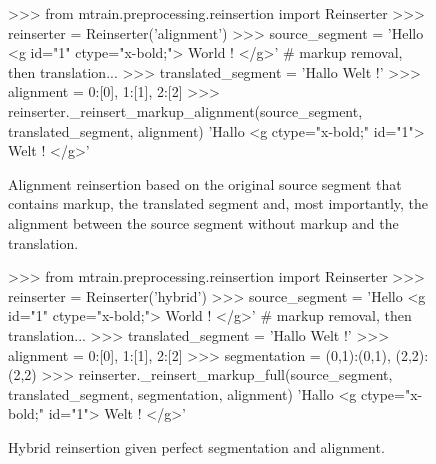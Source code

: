 \documentclass[11pt,letterpaper]{article}
\begin{document}
\begin{figure*}
\renewcommand\figurename{Listing}

\begin{python}
>>> from mtrain.preprocessing.reinsertion import Reinserter
>>> reinserter = Reinserter('alignment')
>>> source_segment = 'Hello <g id="1" ctype="x-bold;"> World ! </g>'
# markup removal, then translation...
>>> translated_segment = 'Hallo Welt !'
>>> alignment = {0:[0], 1:[1], 2:[2]}
>>> reinserter._reinsert_markup_alignment(source_segment, translated_segment,
    alignment)
'Hallo <g ctype="x-bold;" id="1"> Welt ! </g>'
\end{python}
\caption{Alignment reinsertion based on the original source segment that contains markup, the translated segment and, most importantly, the alignment between the source segment without markup and the translation.}
\label{py:alignmentreinsertion}
\end{figure*}

\begin{figure*}[]
\renewcommand\figurename{Listing}

\begin{python}
>>> from mtrain.preprocessing.reinsertion import Reinserter
>>> reinserter = Reinserter('hybrid')
>>> source_segment = 'Hello <g id="1" ctype="x-bold;"> World ! </g>'
# markup removal, then translation...
>>> translated_segment = 'Hallo Welt !'
>>> alignment = {0:[0], 1:[1], 2:[2]}
>>> segmentation = {(0,1):(0,1), (2,2):(2,2)}
>>> reinserter._reinsert_markup_full(source_segment, translated_segment,
    segmentation, alignment)
'Hallo <g ctype="x-bold;" id="1"> Welt ! </g>'
\end{python}
\caption{Hybrid reinsertion given perfect segmentation and alignment.}
\label{py:hybridreinsertion}
\end{figure*}
\end{document}
